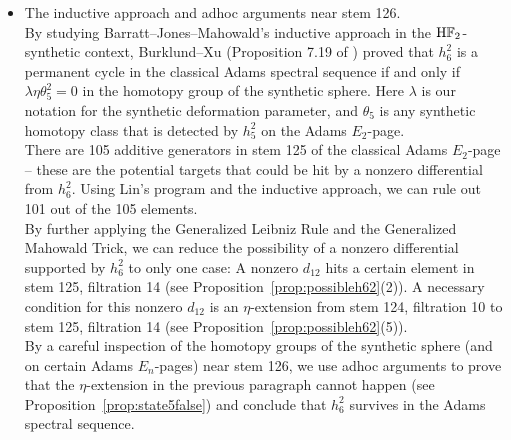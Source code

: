 \documentclass{amsart}
\numberwithin{equation}{section}
\newcommand{\HF}{\mathrm{H}\bF_2}
\begin{document}
\begin{itemize}
    \item The inductive approach and adhoc arguments near stem 126.\\

    \noindent By studying Barratt--Jones--Mahowald's inductive approach \cite{BJMinduction} in the $\HF$-synthetic context, Burklund--Xu (Proposition 7.19 of \cite{BurklundXu}) proved that $h_6^2$ is a permanent cycle in the classical Adams spectral sequence if and only if $\lambda \eta \theta_5^2 = 0$ in the homotopy group of the synthetic sphere. Here $\lambda$ is our notation for the synthetic deformation parameter, and $\theta_5$ is any synthetic homotopy class that is detected by $h_5^2$ on the Adams $E_2$-page.   \\

    \noindent There are 105 additive generators in stem 125 of the classical Adams $E_2$-page -- these are the potential targets that could be hit by a nonzero differential from $h_6^2$. Using Lin's program and the inductive approach, we can rule out 101 out of the 105 elements.\\
    
    \noindent By further applying the Generalized Leibniz Rule and the Generalized Mahowald Trick, we can reduce the possibility of a nonzero differential supported by $h_6^2$ to only one case: A nonzero $d_{12}$ hits a certain element in stem 125, filtration 14 (see Proposition~\ref{prop:possibleh62}(2)). A necessary condition for this nonzero $d_{12}$ is an $\eta$-extension from stem 124, filtration 10 to stem 125, filtration 14 (see Proposition~\ref{prop:possibleh62}(5)). \\
    
    \noindent By a careful inspection of the homotopy groups of the synthetic sphere (and on certain Adams $E_n$-pages) near stem 126, we use adhoc arguments to prove that the $\eta$-extension in the previous paragraph cannot happen (see Proposition~\ref{prop:state5false}) and conclude that $h_6^2$ survives in the Adams spectral sequence. \\
\end{itemize} 
\end{document}
